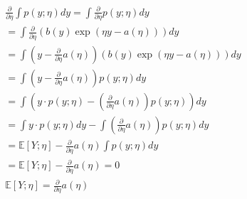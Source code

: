\begin{answer}
\begin{eqnarray*}
\frac{\partial}{\partial \eta} \int p(y;\eta) dy = \int \frac{\partial}{\partial \eta} p(y;\eta) dy\\
=\int \frac{\partial}{\partial \eta} \left(b(y)\exp(\eta y - a(\eta))\right) dy\\
=\int\left(y-\frac{\partial}{\partial \eta}a(\eta)\right)\left(b(y)\exp(\eta y - a(\eta))\right) dy\\
=\int\left(y-\frac{\partial}{\partial \eta}a(\eta)\right)p(y;\eta)dy\\
=\int\left(y\cdot p(y;\eta)-\left(\frac{\partial}{\partial \eta}a(\eta)\right)p(y;\eta)\right)dy\\
=\int y\cdot p(y;\eta)dy-\int\left(\frac{\partial}{\partial \eta}a(\eta)\right)p(y;\eta) dy\\
=\mathbb{E}[Y; \eta]-\frac{\partial}{\partial \eta}a(\eta) \int p(y;\eta) dy\\
=\mathbb{E}[Y; \eta]-\frac{\partial}{\partial \eta}a(\eta)=0
\\
\mathbb{E}[Y; \eta]=\frac{\partial}{\partial \eta}a(\eta)
\end{eqnarray*}
\end{answer}
